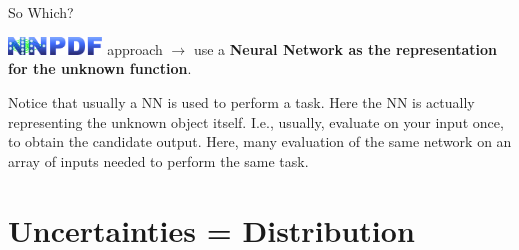 \documentclass[9pt]{beamer}
\begin{document}
\begin{frame}{So Which?}
    \begin{center}
        \includegraphics[width=2.5cm]{../_logos/nnpdf_logo.png} approach $\to$
        use a \textbf{Neural Network as the \alert{representation} for the
        unknown function}.
    \end{center}
    \vspace*{10pt}

    Notice that usually a NN is used to perform a task. Here the NN is actually
    representing the unknown object itself.\newline
    \vspace*{-2pt}
    {\footnotesize
        \hspace*{-5pt}
        I.e., usually, evaluate on your input once, to obtain the candidate
        output. Here, many evaluation of the same network on an array of inputs
        needed to perform the same task.
    }
\end{frame}

\section{Uncertainties = Distribution}
\end{document}
